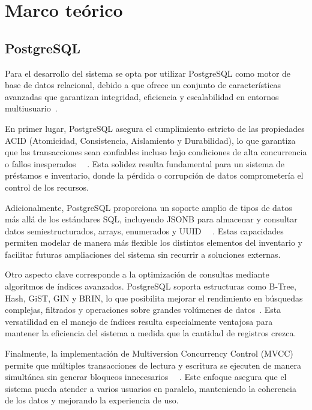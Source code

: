 \section{Marco teórico}\label{sec:marco_teorico}

\subsection{PostgreSQL}

Para el desarrollo del sistema se opta por utilizar PostgreSQL como motor de base de datos relacional, debido a que ofrece un conjunto de características avanzadas que garantizan integridad, eficiencia y escalabilidad en entornos multiusuario~\cite{aws_mysql_postgresql}.

En primer lugar, PostgreSQL asegura el cumplimiento estricto de las propiedades ACID (Atomicidad, Consistencia, Aislamiento y Durabilidad), lo que garantiza que las transacciones sean confiables incluso bajo condiciones de alta concurrencia o fallos inesperados
~\cite{devto_postgresql_acid}~\cite{airbyte_sqlite_postgresql}.
Esta solidez resulta fundamental para un sistema de préstamos e inventario, donde la pérdida o corrupción de datos comprometería el control de los recursos.

Adicionalmente, PostgreSQL proporciona un soporte amplio de tipos de datos más allá de los estándares SQL, incluyendo JSONB para almacenar y consultar datos semiestructurados, arrays, enumerados y UUID
~\cite{airbyte_sqlite_postgresql}~\cite{prisma_postgresql_benefits}.
Estas capacidades permiten modelar de manera más flexible los distintos elementos del inventario y facilitar futuras ampliaciones del sistema sin recurrir a soluciones externas.

Otro aspecto clave corresponde a la optimización de consultas mediante algoritmos de índices avanzados. PostgreSQL soporta estructuras como B-Tree, Hash, GiST, GIN y BRIN, lo que posibilita mejorar el rendimiento en búsquedas complejas, filtrados y operaciones sobre grandes volúmenes de datos~\cite{prisma_postgresql_benefits}. Esta versatilidad en el manejo de índices resulta especialmente ventajosa para mantener la eficiencia del sistema a medida que la cantidad de registros crezca.

Finalmente, la implementación de Multiversion Concurrency Control (MVCC) permite que múltiples transacciones de lectura y escritura se ejecuten de manera simultánea sin generar bloqueos innecesarios
~\cite{aws_mysql_postgresql}~\cite{airbyte_sqlite_postgresql}.
Este enfoque asegura que el sistema pueda atender a varios usuarios en paralelo, manteniendo la coherencia de los datos y mejorando la experiencia de uso.

